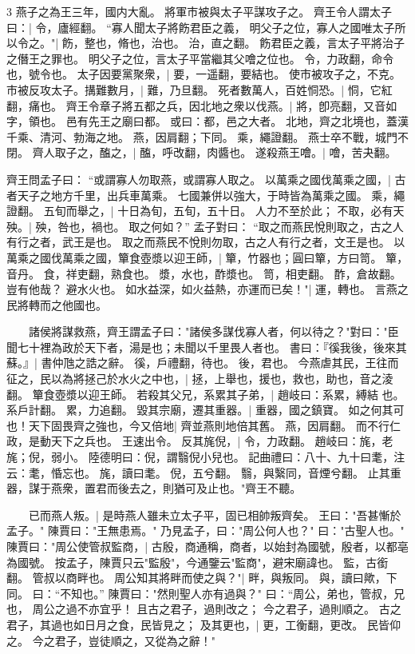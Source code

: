 3 燕子之為王三年，國内大亂。
  將軍市被與太子平謀攻子之。
  齊王令人謂太子曰：|{
	令，廬經翻。
}
“寡人聞太子將飭君臣之義，
明父子之位，寡人之國唯太子所以令之。"|{
	飭，整也，脩也，治也。
	治，直之翻。
	飭君臣之義，言太子平將治子之僭王之罪也。
	明父子之位，言太子平當繼其父噲之位也。
	令，力政翻，命令也，號令也。
}
太子因要黨聚衆，|{
	要，一遥翻，要結也。
}
使市被攻子之，不克。市被反攻太子。搆難數月，|{
	難，乃旦翻。
}
死者數萬人，百姓恫恐。|{
	恫，它紅翻，痛也。
}
齊王令章子將五都之兵，因北地之衆以伐燕。|{
	將，卽亮翻，又音如字，領也。
	邑有先王之廟曰都。
	或曰：都，邑之大者。
	北地，齊之北境也，蓋漢千乘、清河、勃海之地。
	燕，因肩翻；下同。
	乘，繩證翻。
}
燕士卒不戰，城門不閉。
	齊人取子之，醢之，|{
	醢，呼改翻，肉醬也。
}
遂殺燕王噲。|{
	噲，苦夬翻。
}

齊王問孟子曰：
“或謂寡人勿取燕，或謂寡人取之。
	以萬乘之國伐萬乘之國，|{
	古者天子之地方千里，出兵車萬乘。
	七國兼併以強大，于時皆為萬乘之國。
	乘，繩證翻。
}
五旬而舉之，|{
	十日為旬，五旬，五十日。
}
人力不至於此；
不取，必有天殃。|{
	殃，咎也，禍也。
}
取之何如？”
孟子對曰：
“取之而燕民悅則取之，古之人有行之者，武王是也。
	取之而燕民不悅則勿取，古之人有行之者，文王是也。
	以萬乘之國伐萬乘之國，簞食壺漿以迎王師，|{
	簞，竹器也；圓曰簞，方曰笥。
	簞，音丹。
	食，祥吏翻，熟食也。
	漿，水也，酢漿也。
	笥，相吏翻。
	酢，倉故翻。
}
豈有他哉？
避水火也。
如水益深，如火益熱，亦運而已矣！"|{
	運，轉也。
	言燕之民將轉而之他國也。
}

　　諸侯將謀救燕，齊王謂孟子曰："諸侯多謀伐寡人者，何以待之？"對曰："臣聞七十裡為政於天下者，湯是也；未聞以千里畏人者也。
	書曰：『徯我後，後來其蘇。』|{
	書仲虺之誥之辭。
	徯，戶禮翻，待也。
	後，君也。
}
今燕虐其民，王往而征之，民以為將拯己於水火之中也，|{
	拯，上舉也，援也，救也，助也，音之淩翻。
}
簞食壺漿以迎王師。
	若殺其父兄，系累其子弟，|{
	趙岐曰：系累，縛結 也。
	系戶計翻。
	累，力追翻。
}
毀其宗廟，遷其重器。|{
	重器，國之鎮寶。
}
如之何其可也！天下固畏齊之強也，今又倍地|{
	齊並燕則地倍其舊。
	燕，因肩翻。
}
而不行仁政，是動天下之兵也。
	王速出令。
	反其旄倪，|{
	令，力政翻。
	趙岐曰：旄，老旄；倪，弱小。
	陸德明曰：倪，謂翳倪小兒也。
	記曲禮曰：八十、九十曰耄，注云：耄，惛忘也。
	旄，讀曰耄。
	倪，五兮翻。
	翳，與繄同，音煙兮翻。
}
止其重器，謀于燕衆，置君而後去之，則猶可及止也。"齊王不聽。


　　已而燕人叛。|{
	是時燕人雖未立太子平，固已相帥叛齊矣。
}
王曰："吾甚慚於孟子。"
陳賈曰："王無患焉。"
乃見孟子，曰："周公何人也？"
曰："古聖人也。"
陳賈曰："周公使管叔監商，|{
	古殷，商通稱，商者，以始封為國號，殷者，以都亳為國號。
	按孟子，陳賈只云"監殷"，今通鑒云"監商"，避宋廟諱也。
	監，古銜翻。
}
管叔以商畔也。
	周公知其將畔而使之與？"|{
	畔，與叛同。
	與，讀曰歟，下同。
}
曰：“不知也。”
陳賈曰："然則聖人亦有過與？"
曰：“周公，弟也，管叔，兄也，
	周公之過不亦宜乎！
	且古之君子，過則改之；
	今之君子，過則順之。
	古之君子，其過也如日月之食，民皆見之；
	及其更也，|{
	更，工衡翻，更改。
}
	民皆仰之。
	今之君子，豈徒順之，又從為之辭！"

